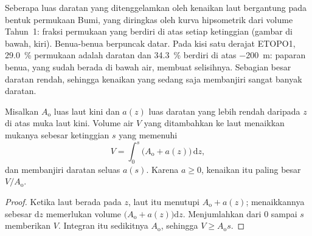 Seberapa luas daratan yang ditenggelamkan oleh kenaikan laut bergantung pada bentuk permukaan Bumi, yang diringkas oleh
kurva hipsometrik dari volume Tahun~1: fraksi permukaan yang berdiri di atas
setiap ketinggian (gambar di bawah, kiri). Benua-benua berpuncak datar. Pada kisi satu derajat
ETOPO1, \qty{29.0}{\percent} permukaan adalah daratan dan \qty{34.3}{\percent} berdiri di atas
\qty{-200}{m}: paparan benua, yang sudah berada di bawah air, membuat selisihnya. Sebagian besar daratan rendah, sehingga
kenaikan yang sedang saja membanjiri sangat banyak daratan.

\begin{proposition}\label{prop:b2:phanerozoic-earth:flooding}
Misalkan $A_{\text{o}}$ luas laut kini dan $a(z)$ luas daratan yang lebih rendah daripada $z$ di atas
muka laut kini. Volume air $V$ yang ditambahkan ke laut menaikkan mukanya sebesar ketinggian $s$
yang memenuhi
\[
V = \int_0^s \bigl(A_{\text{o}} + a(z)\bigr)\,\mathrm{d}z ,
\]
dan membanjiri daratan seluas $a(s)$. Karena $a \ge 0$, kenaikan itu paling besar $V/A_{\text{o}}$.
\end{proposition}

\begin{proof}
Ketika laut berada pada $z$, laut itu menutupi $A_{\text{o}} + a(z)$; menaikkannya sebesar $\mathrm{d}z$ memerlukan
volume $\bigl(A_{\text{o}} + a(z)\bigr)\mathrm{d}z$. Menjumlahkan dari 0 sampai $s$ memberikan $V$. Integran
itu sedikitnya $A_{\text{o}}$, sehingga $V \ge A_{\text{o}}s$.
\end{proof}

